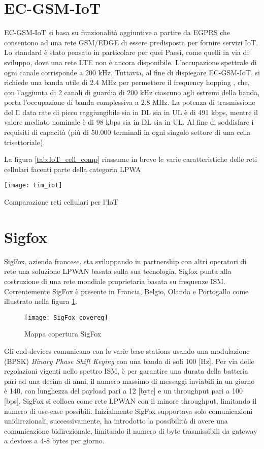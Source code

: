 \section{EC-GSM-IoT}
EC-GSM-IoT si basa su funzionalità aggiuntive a partire da EGPRS che consentono
ad una rete GSM/EDGE di essere predisposta per fornire servizi IoT. Lo standard
è stato pensato in particolare per quei Paesi, come quelli in via di sviluppo,
dove una rete LTE non è ancora disponibile. L’occupazione spettrale di ogni
canale corrisponde a  200 kHz.  Tuttavia, al fine di dispiegare EC-GSM-IoT, si
richiede una banda utile di 2.4 MHz per permettere il frequency hopping , che,
con l’aggiunta di 2 canali di guardia di 200 kHz ciascuno agli estremi della
banda, porta l’occupazione di banda complessiva a 2.8 MHz.  La
potenza di trasmissione del Il data rate di picco raggiungibile sia in DL sia in
UL è di 491 kbps, mentre il valore mediato nominale è di 98 kbps sia in DL sia
in UL. Al fine di soddisfare i requisiti di capacità (più di 50.000 terminali in
ogni singolo settore di una cella trisettoriale). 

La figura \ref{tab:IoT_cell_comp} riassume in breve le varie caratteristiche
delle reti cellulari facenti parte della categoria LPWA
\begin{table}[h]
    \centering 
                \texttt{[image: tim\_iot]}
    \caption{Comparazione reti cellulari per l'IoT}
    \label{tab:IoT_cell_comp} 
\end{table}



\section{Sigfox}
SigFox, azienda francese, sta sviluppando in partnership con altri operatori di
rete una soluzione LPWAN basata sulla sua tecnologia. Sigfox punta alla
costruzione di una rete mondiale proprietaria basata su frequenze ISM.
Correntemente SigFox è presente in Francia, Belgio, Olanda e Portogallo come
illustrato nella figura \ref{fig:Sig_covereg}.
\begin{figure}[h]
    \centering 
                \texttt{[image: SigFox\_covereg]}
    \caption{Mappa copertura SigFox}
    \label{fig:Sig_covereg} 
\end{figure}

Gli end-devices comunicano con le varie base stations usando una modulazione (BPSK)
\emph{Binary Phase Shift Keying} con una banda di soli 100 [Hz]. 
Per via delle regolazioni vigenti nello spettro ISM, è per garantire una durata
della batteria pari ad una decina di anni, il numero massimo di messaggi
inviabili in un giorno è 140, con lunghezza del payload pari a 12 [byte] e un
throughput pari a 100 [bps]. SigFox si colloca come rete LPWAN con il minore
throughput, limitando il numero di use-case possibili. Inizialmente SigFox
supportava solo comunicazioni unidirezionali, successivamente, ha introdotto la
possibilità di avere una comunicazione bidirezionale, limitando il numero di
byte trasmissibili da gateway a devices a 4-8 bytes per giorno.

